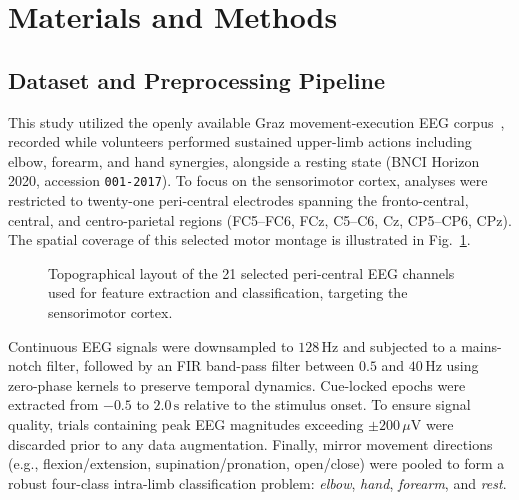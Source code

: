 \section{Materials and Methods}
\label{sec:methods}

\subsection{Dataset and Preprocessing Pipeline}
\label{sec:dataprep}
This study utilized the openly available Graz movement-execution EEG corpus~\cite{ofner2017upper}, recorded while volunteers performed sustained upper-limb actions including elbow, forearm, and hand synergies, alongside a resting state (BNCI Horizon 2020, accession \texttt{001-2017}). To focus on the sensorimotor cortex, analyses were restricted to twenty-one peri-central electrodes spanning the fronto-central, central, and centro-parietal regions (FC5--FC6, FCz, C5--C6, Cz, CP5--CP6, CPz). The spatial coverage of this selected motor montage is illustrated in Fig.~\ref{fig:montage}. 

\begin{figure}[H]
  \centering
   
  \caption{Topographical layout of the 21 selected peri-central EEG channels used for feature extraction and classification, targeting the sensorimotor cortex.}
  \label{fig:montage}
\end{figure}

Continuous EEG signals were downsampled to $128\,\text{Hz}$ and subjected to a mains-notch filter, followed by an FIR band-pass filter between $0.5$ and $40\,\text{Hz}$ using zero-phase kernels to preserve temporal dynamics. Cue-locked epochs were extracted from $-0.5$ to $2.0\,\text{s}$ relative to the stimulus onset. To ensure signal quality, trials containing peak EEG magnitudes exceeding $\pm 200\,\mu\text{V}$ were discarded prior to any data augmentation. Finally, mirror movement directions (e.g., flexion/extension, supination/pronation, open/close) were pooled to form a robust four-class intra-limb classification problem: \emph{elbow}, \emph{hand}, \emph{forearm}, and \emph{rest}.

